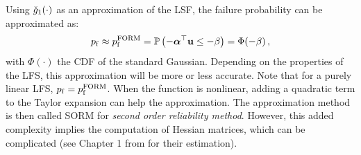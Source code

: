 Using $\check{g}_1(\cdot)$ as an approximation of the LSF, the failure probability can be approximated as: 
\begin{equation}
    p_\mathrm{f} \approx p_\mathrm{f}^{\mathrm{FORM}} = \mathbb{P}\left(- {\boldsymbol{\alpha}}^\top {\bf u} \leq -\beta\right) = \Phi(-\beta)\, ,
\end{equation} 
with $\Phi(\cdot)$ the CDF of the standard Gaussian. 
Depending on the properties of the LFS, this approximation will be more or less accurate. 
Note that for a purely linear LFS, $p_\mathrm{f} = p_\mathrm{f}^{\mathrm{FORM}}$. 
When the function is nonlinear, adding a quadratic term to the Taylor expansion can help the approximation. 
The approximation method is then called SORM for \textit{second order reliability method}. 
However, this added complexity implies the computation of Hessian matrices, which can be complicated (see Chapter 1 from \citealp{bourinet_2018} for their estimation).



